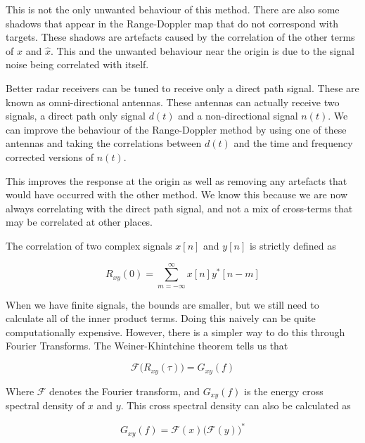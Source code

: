 \documentclass[12pt,openany,a4paper]{book}
\begin{document}
\bigskip

This is not the only unwanted behaviour of this method. There are also some shadows that appear in the Range-Doppler map that do not correspond with targets. These shadows are artefacts caused by the correlation of the other terms of $x$ and $\hat{x}$. This and the unwanted behaviour near the origin is due to the signal noise being correlated with itself.

\bigskip

Better radar receivers can be tuned to receive only a direct path signal. These are known as omni-directional antennas. These antennas can actually receive two signals, a direct path only signal $d(t)$ and a non-directional signal $n(t)$. We can improve the behaviour of the Range-Doppler method by using one of these antennas and taking the correlations between $d(t)$ and the time and frequency corrected versions of $n(t)$.

\bigskip

This improves the response at the origin as well as removing any artefacts that would have occurred with the other method. We know this because we are now always correlating with the direct path signal, and not a mix of cross-terms that may be correlated at other places.

\bigskip

The correlation of two complex signals $x[n]$ and $y[n]$ is strictly defined as

\begin{equation}
R_{xy}(0) = \sum_{m=-\infty}^{\infty} x[n] y^*[n-m]
\end{equation}

\bigskip

When we have finite signals, the bounds are smaller, but we still need to calculate all of the inner product terms. Doing this naively can be quite computationally expensive. However, there is a simpler way to do this through Fourier Transforms. The Weiner-Khintchine theorem tells us that 

\begin{equation}
\mathcal{F} \bigg(R_{xy}(\tau) \bigg) = G_{xy}(f)
\end{equation}

\bigskip

Where $\mathcal{F}$ denotes the Fourier transform, and $G_{xy}(f)$ is the energy cross spectral density of $x$ and $y$. This cross spectral density can also be calculated as 

\begin{equation}
G_{xy}(f) = \mathcal{F}(x) \bigg(\mathcal{F}(y)\bigg)^*
\end{equation}
\end{document}
